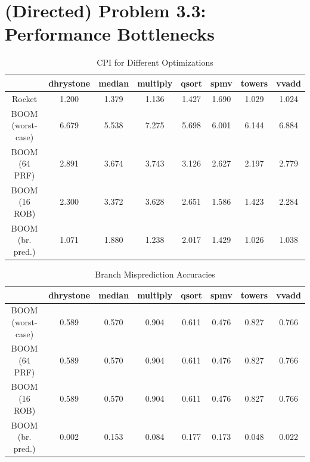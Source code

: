 \documentclass[11pt]{article}
\begin{document}
\section*{(Directed) Problem 3.3: Performance Bottlenecks}

\begin{table}[ht]
	\caption{CPI for Different Optimizations} %
	\centering %
	\begin{tabular}{c c c c c c c c} %
		\hline\hline %
		                  & dhrystone & median & multiply & qsort & spmv  & towers & vvadd \\ [0.5ex] %
		\hline %
		Rocket            & 1.200     & 1.379  & 1.136    & 1.427 & 1.690 & 1.029  & 1.024 \\
		BOOM (worst-case) & 6.679     & 5.538  & 7.275    & 5.698 & 6.001 & 6.144  & 6.884 \\
		BOOM (64 PRF)     & 2.891     & 3.674  & 3.743    & 3.126 & 2.627 & 2.197  & 2.779 \\
		BOOM (16 ROB)     & 2.300     & 3.372  & 3.628    & 2.651 & 1.586 & 1.423  & 2.284 \\
		BOOM (br. pred.)  & 1.071     & 1.880  & 1.238    & 2.017 & 1.429 & 1.026  & 1.038 \\
		[1ex] %
		\hline %
	\end{tabular}
	\label{table:nonlin} %
\end{table}

\begin{table}[ht]
	\caption{Branch Misprediction Accuracies} %
	\centering %
	\begin{tabular}{c c c c c c c c} %
		\hline\hline %
		                  & dhrystone & median & multiply & qsort & spmv  & towers & vvadd \\ [0.5ex] %
		\hline %
		BOOM (worst-case) & 0.589     & 0.570  & 0.904    & 0.611 & 0.476 & 0.827  & 0.766 \\
		BOOM (64 PRF)     & 0.589     & 0.570  & 0.904    & 0.611 & 0.476 & 0.827  & 0.766 \\
		BOOM (16 ROB)     & 0.589     & 0.570  & 0.904    & 0.611 & 0.476 & 0.827  & 0.766 \\
		BOOM (br. pred.)  & 0.002     & 0.153  & 0.084    & 0.177 & 0.173 & 0.048  & 0.022 \\
		[1ex] %
		\hline %
	\end{tabular}
	\label{table:nonlin} %
\end{table}
\end{document}
